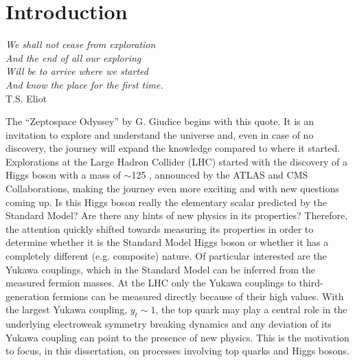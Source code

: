 \chapter*{Introduction}

\begin{flushright}
\emph{We shall not cease from exploration\\
And the end of all our exploring\\
Will be to arrive where we started\\
And know the place for the first time.\\} 
T.S. Eliot
\end{flushright}

The ``Zeptospace Odyssey'' by G. Giudice begins with this quote. It is an invitation to explore and understand the universe and, even in case of no discovery, the journey will expand the knowledge compared to where it started. Explorations at the Large Hadron Collider (LHC) started with the discovery of a Higgs boson with a mass of $\sim$125 \gev, announced by the ATLAS and CMS Collaborations, making the journey even more exciting and with new questions coming up.
Is this Higgs boson really the elementary scalar predicted by the Standard Model? Are there any hints of new physics in its properties? Therefore, the attention quickly shifted towards measuring its properties in order to determine whether it is the Standard Model Higgs boson or whether it has a completely different (e.g. composite) nature. Of particular interested are the Yukawa couplings, which in the Standard Model can be inferred from the measured fermion masses. At the LHC only the Yukawa couplings to third-generation fermions can be measured directly because of their high values. With the largest Yukawa coupling, $y_{t}\sim1$, the top quark may play a central role in the underlying electroweak symmetry breaking dynamics and any deviation of its Yukawa coupling can point to the presence of new physics. This is the motivation to focus, in this dissertation, on processes involving top quarks and Higgs bosons.\par
